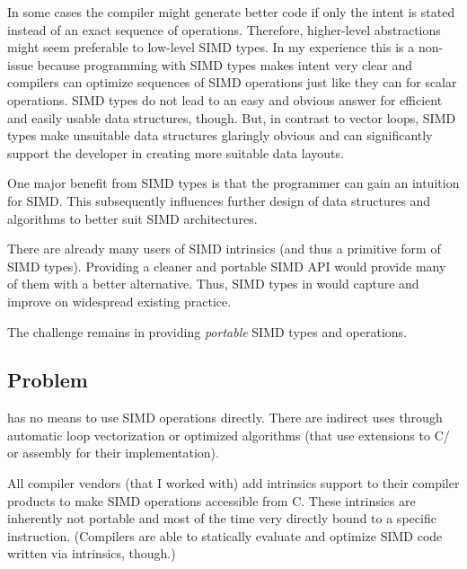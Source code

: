 In some cases the compiler might generate better code if only the intent is stated instead of an exact sequence of operations.
Therefore, higher-level abstractions might seem preferable to low-level SIMD types.
In my experience this is a non-issue because programming with SIMD types makes intent very clear and compilers can optimize sequences of SIMD operations just like they can for scalar operations.
SIMD types do not lead to an easy and obvious answer for efficient and easily usable data structures, though.
But, in contrast to vector loops, SIMD types make unsuitable data structures glaringly obvious and can significantly support the developer in creating more suitable data layouts.

One major benefit from SIMD types is that the programmer can gain an intuition for SIMD.
This subsequently influences further design of data structures and algorithms to better suit SIMD architectures.

There are already many users of SIMD intrinsics (and thus a primitive form of SIMD types).
Providing a cleaner and portable SIMD API would provide many of them with a better alternative.
Thus, SIMD types in \CC{} would capture and improve on widespread existing practice.

The challenge remains in providing \emph{portable} SIMD types and operations.

\subsection{Problem}
\CC{} has no means to use SIMD operations directly.
There are indirect uses through automatic loop vectorization or optimized algorithms (that use extensions to C/\CC{} or assembly for their implementation).

All compiler vendors (that I worked with) add intrinsics support to their compiler products to make SIMD operations accessible from C.
These intrinsics are inherently not portable and most of the time very directly bound to a specific instruction.
(Compilers are able to statically evaluate and optimize SIMD code written via intrinsics, though.)

